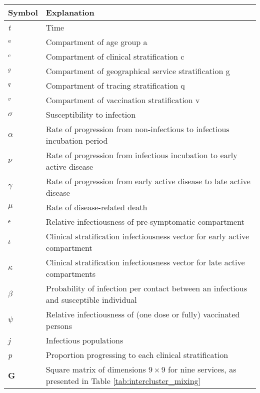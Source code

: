 \begin{table}[ht]
\renewcommand{\baselinestretch}{1}
    	\begin{tabular}{| p{2cm} | p{11.1cm} |}
    	\hline
    		Symbol & Explanation \\
    		\hline
    		\textit{t} & Time  \\
    		$_{\textit{a}}$ & Compartment of age group a \\
    		$_{\textit{c}}$ & Compartment of clinical stratification c \\
    		$_{\textit{g}}$ & Compartment of geographical service stratification g \\
    		$_{\textit{q}}$ & Compartment of tracing stratification q \\
    		$_{\textit{v}}$ & Compartment of vaccination stratification v \\
    		$\sigma$ & Susceptibility to infection \\
    		$\alpha$ & Rate of progression from non-infectious to infectious incubation period \\
    		$\nu$ & Rate of progression from infectious incubation to early active disease \\
    		$\gamma$ & Rate of progression from early active disease to late active disease \\
    		$\mu$ & Rate of disease-related death \\
    		$\epsilon$ & Relative infectiousness of pre-symptomatic compartment \\
    		$\iota$ & Clinical stratification infectiousness vector for early active compartment \\
    		$\kappa$ & Clinical stratification infectiousness vector for late active compartments \\
    		$\beta$ & Probability of infection per contact between an infectious and susceptible individual \\
    		$\psi$ & Relative infectiousness of (one dose or fully) vaccinated persons \\
	    	\textit{j} & Infectious populations \\
    		\textit{p} & Proportion progressing to each clinical stratification \\
    		\textbf{G} & Square matrix of dimensions \(9 \times 9\) for nine services, as presented in Table \ref{tab:intercluster_mixing} \\
    \hline
	\end{tabular}
\end{table}

